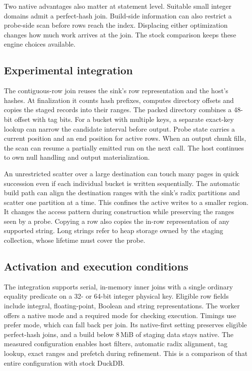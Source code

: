 \documentclass[11pt,a4paper]{article}
\begin{document}
Two native advantages also matter at statement level. Suitable small integer domains admit a
perfect-hash join. Build-side information can also restrict a probe-side scan before rows reach
the index. Displacing either optimization changes how much work arrives at the join. The stock
comparison keeps these engine choices available.

\subsection{Experimental integration}
The contiguous-row join reuses the sink's row representation and the host's hashes. At finalization it
counts hash prefixes, computes directory offsets and copies the staged records into their ranges.
The packed directory combines a 48-bit offset with tag bits. For a bucket with multiple keys, a
separate exact-key lookup can narrow the candidate interval before output. Probe state carries a
current position and an end position for active rows. When an output chunk fills, the scan can
resume a partially emitted run on the next call. The host continues to own null handling and
output materialization.

An unrestricted scatter over a large destination can touch many pages in quick succession even if
each individual bucket is written sequentially. The automatic build path can align the destination
ranges with the sink's radix partitions and scatter one partition at a time. This confines the
active writes to a smaller region. It changes the access pattern during construction while
preserving the ranges seen by a probe. Copying a row also copies the in-row representation of any
supported string. Long strings refer to heap storage owned by the staging collection, whose
lifetime must cover the probe.

\subsection{Activation and execution conditions}
The integration supports serial, in-memory inner joins with a single ordinary equality predicate
on a 32- or 64-bit integer physical key. Eligible row fields include integral, floating-point,
Boolean and string representations. The worker offers a native mode and a required mode for
checking execution. Timings use prefer mode, which can fall back per join. Its native-first
setting preserves eligible perfect-hash joins, and a build below 8\,MiB of staging data stays
native. The measured configuration enables host filters, automatic radix alignment, tag lookup,
exact ranges and prefetch during refinement. This is a comparison of that entire configuration
with stock DuckDB.
\end{document}

